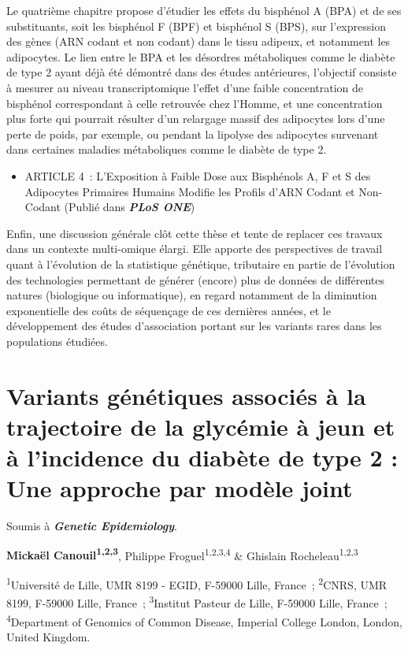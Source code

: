 \documentclass[11pt,a4paper,notrimn]{krantz}
\providecommand{\tightlist}{%
  \setlength{\itemsep}{0pt}\setlength{\parskip}{0pt}}
\theoremstyle{definition}
\theoremstyle{definition}
\theoremstyle{remark}
\begin{document}
Le quatrième chapitre propose d'étudier les effets du bisphénol A (BPA)
et de ses substituants, soit les bisphénol F (BPF) et bisphénol S (BPS),
sur l'expression des gènes (ARN codant et non codant) dans le tissu
adipeux, et notamment les adipocytes. Le lien entre le BPA et les
désordres métaboliques comme le diabète de type 2 ayant déjà été
démontré dans des études antérieures, l'objectif consiste à mesurer au
niveau transcriptomique l'effet d'une faible concentration de bisphénol
correspondant à celle retrouvée chez l'Homme, et une concentration plus
forte qui pourrait résulter d'un relargage massif des adipocytes lors
d'une perte de poids, par exemple, ou pendant la lipolyse des adipocytes
survenant dans certaines maladies métaboliques comme le diabète de type
2.

\begin{itemize}
\tightlist
\item
  ARTICLE 4~: L'Exposition à Faible Dose aux Bisphénols A, F et S des
  Adipocytes Primaires Humains Modifie les Profils d'ARN Codant et
  Non-Codant (Publié dans \textbf{\emph{PLoS ONE}})
\end{itemize}

Enfin, une discussion générale clôt cette thèse et tente de replacer ces
travaux dans un contexte multi-omique élargi. Elle apporte des
perspectives de travail quant à l'évolution de la statistique génétique,
tributaire en partie de l'évolution des technologies permettant de
générer (encore) plus de données de différentes natures (biologique ou
informatique), en regard notamment de la diminution exponentielle des
coûts de séquençage de ces dernières années, et le développement des
études d'association portant sur les variants rares dans les populations
étudiées.

\chapter{Variants génétiques associés à la trajectoire de la glycémie à
jeun et à l'incidence du diabète de type 2 : Une approche par modèle
joint}\label{Article1}

Soumis à \textbf{\emph{Genetic Epidemiology}}.

\textbf{Mickaël Canouil\textsuperscript{1,2,3}}, Philippe
Froguel\textsuperscript{1,2,3,4} \& Ghislain
Rocheleau\textsuperscript{1,2,3}

\footnotesize
\textsuperscript{1}Université de Lille, UMR 8199 - EGID, F-59000 Lille,
France~; \textsuperscript{2}CNRS, UMR 8199, F-59000 Lille, France~;
\textsuperscript{3}Institut Pasteur de Lille, F-59000 Lille, France~;
\textsuperscript{4}Department of Genomics of Common Disease, Imperial
College London, London, United Kingdom. \normalsize
\end{document}
